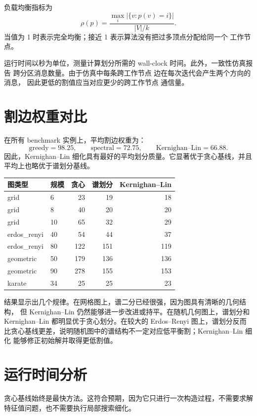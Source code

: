 \documentclass[UTF8, 11pt]{ctexart}
\begin{document}
负载均衡指标为
\[
    \rho(p)=
    \frac{\max_i |\{v:p(v)=i\}|}{|V|/k}.
\]
当值为 1 时表示完全均衡；接近 1 表示算法没有把过多顶点分配给同一个 工作节点。

运行时间以秒为单位，测量计算划分所需的 wall-clock 时间。此外，一致性仿真报告
跨分区消息数量。由于仿真中每条跨工作节点 边在每次迭代会产生两个方向的消息，
因此更低的割值应当对应更少的跨工作节点 通信量。

\section{割边权重对比}

在所有 benchmark 实例上，平均割边权重为：
\[
    \text{greedy}=98.25,\qquad
    \text{spectral}=72.75,\qquad
    \text{Kernighan--Lin}=66.88.
\]
因此，Kernighan--Lin 细化具有最好的平均划分质量。它显著优于贪心基线，并且
平均上也略优于谱划分基线。

\begin{center}
\begin{tabular}{llrrr}
\toprule
图类型 & 规模 & 贪心 & 谱划分 & Kernighan--Lin \\
\midrule
grid & 6 & 23 & 19 & 18 \\
grid & 8 & 40 & 20 & 20 \\
grid & 10 & 65 & 32 & 29 \\
erdos\_renyi & 40 & 54 & 44 & 37 \\
erdos\_renyi & 80 & 122 & 151 & 119 \\
geometric & 50 & 179 & 136 & 136 \\
geometric & 90 & 278 & 155 & 153 \\
karate & 34 & 25 & 25 & 23 \\
\bottomrule
\end{tabular}
\end{center}

结果显示出几个规律。在网格图上，谱二分已经很强，因为图具有清晰的几何结构，
但 Kernighan--Lin 仍然能够进一步改进或持平。在随机几何图上，谱划分和
Kernighan--Lin 都明显优于贪心划分。在较大的 Erdos--Renyi 图上，谱划分反而
比贪心基线更差，说明随机图中的谱结构不一定对应低平衡割；Kernighan--Lin 细化
能够修正初始解并取得更低割值。

\section{运行时间分析}

贪心基线始终是最快方法。这符合预期，因为它只进行一次构造过程，不需要求解
特征值问题，也不需要执行局部搜索细化。
\end{document}
